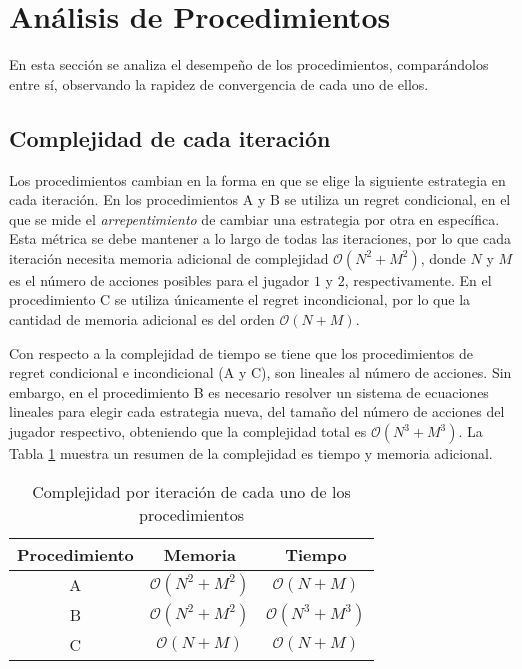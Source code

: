 \section{Análisis de Procedimientos}

En esta sección se analiza el desempeño de los procedimientos, comparándolos entre sí, observando la rapidez de convergencia de cada uno de ellos.

\subsection{Complejidad de cada iteración}

Los procedimientos cambian en la forma en que se elige la siguiente estrategia en cada iteración. En los procedimientos A y B se utiliza un regret condicional, en el que se mide el \textit{arrepentimiento} de cambiar una estrategia por otra en específica. Esta métrica se debe mantener a lo largo de todas las iteraciones, por lo que cada iteración necesita memoria adicional de complejidad $\mathcal{O}(N^2 + M^2)$, donde $N$ y $M$ es el número de acciones posibles para el jugador $1$ y $2$, respectivamente. En el procedimiento C se utiliza únicamente el regret incondicional, por lo que la cantidad de memoria adicional es del orden $\mathcal{O}(N + M)$.

Con respecto a la complejidad de tiempo se tiene que los procedimientos de regret condicional e incondicional (A y C), son lineales al número de acciones. Sin embargo, en el procedimiento B es necesario resolver un sistema de ecuaciones lineales para elegir cada estrategia nueva, del tamaño del número de acciones del jugador respectivo, obteniendo que la complejidad total es $\mathcal{O}(N^3 + M^3)$. La Tabla \ref{tab:complejidades-iteraciones} muestra un resumen de la complejidad es tiempo y memoria adicional.

\begin{table}[ht]
    \centering
    \begin{tabular}{c|c|c}
         Procedimiento & Memoria & Tiempo  \\ \hline
         A & $\mathcal{O}(N^2 + M^2)$ & $\mathcal{O}(N + M)$ \\ 
         B & $\mathcal{O}(N^2 + M^2)$ & $\mathcal{O}(N^3 + M^3)$ \\
         C & $\mathcal{O}(N + M)$     & $\mathcal{O}(N + M)$ \\ \hline
    \end{tabular}
    \caption{Complejidad por iteración de cada uno de los procedimientos}
    \label{tab:complejidades-iteraciones}
\end{table}

